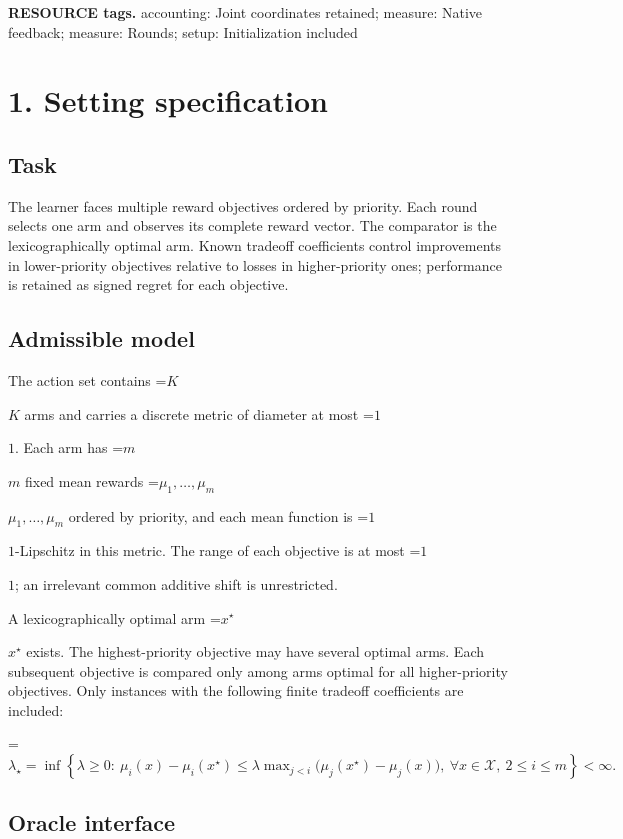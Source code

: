 \documentclass[10pt,a4paper]{article}
\newcommand{\AtlasMath}[1]{\par\begingroup\centering\setbox0=\hbox{$\displaystyle #1$}\ifdim\wd0>1.4\linewidth\typeout{ATLAS WIDE FORMULA: \the\wd0}\fi\ifdim\wd0>\linewidth\resizebox{\linewidth}{!}{\box0}\else\box0\fi\par\endgroup}
\newcommand{\AtlasInlineMath}[1]{\begingroup\setbox0=\hbox{$#1$}\ifdim\wd0>.4\linewidth\endgroup\AtlasMath{#1}\else\endgroup$#1$\fi}
\begin{document}
\textbf{RESOURCE tags.} accounting: Joint coordinates retained; measure: Native feedback; measure: Rounds; setup: Initialization included



\section{1. Setting specification}


\subsection{Task}


The learner faces multiple reward objectives ordered by priority. Each round selects one arm and observes its complete reward vector. The comparator is the lexicographically optimal arm. Known tradeoff coefficients control improvements in lower-priority objectives relative to losses in higher-priority ones; performance is retained as signed regret for each objective.



\subsection{Admissible model}


The action set contains \AtlasInlineMath{K} arms and carries a discrete metric of diameter at most \AtlasInlineMath{1}. Each arm has \AtlasInlineMath{m} fixed mean rewards \AtlasInlineMath{\mu_1,\ldots,\mu_m} ordered by priority, and each mean function is \AtlasInlineMath{1}-Lipschitz in this metric. The range of each objective is at most \AtlasInlineMath{1}; an irrelevant common additive shift is unrestricted.



A lexicographically optimal arm \AtlasInlineMath{x^\star} exists. The highest-priority objective may have several optimal arms. Each subsequent objective is compared only among arms optimal for all higher-priority objectives. Only instances with the following finite tradeoff coefficients are included:




\AtlasMath{\lambda_\star=\inf\!\left\{\lambda\ge0:\ \mu_i(x)-\mu_i(x^\star)\le\lambda\max_{j<i}\bigl(\mu_j(x^\star)-\mu_j(x)\bigr),\ \forall x\in\mathcal{X},\ 2\le i\le m\right\}<\infty.}




\subsection{Oracle interface}
\end{document}
